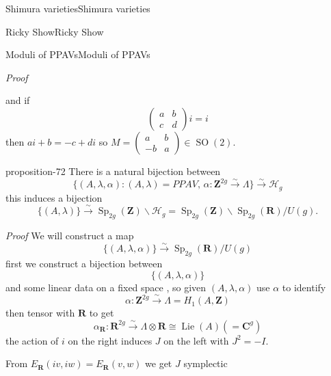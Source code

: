 \documentclass[10pt,]{book}
\makeatletter
\renewcommand*{\proofname}{Proof}
\renewenvironment{proof}[1][\proofname]{\par
  \pushQED{\qed}%
  \normalfont \topsep6\p@\@plus6\p@\relax
  \trivlist
  \item\relax
    {\itshape
    #1\@addpunct{.}}\hspace\labelsep\ignorespaces
}{%
  \popQED\endtrivlist\@endpefalse
}
\numberwithin{equation}{section}
\newcommand{\Lie}{\operatorname{Lie}}
\newcommand{\ZZ}{\mathbf{Z}}
\newcommand{\RR}{\mathbf{R}}
\newcommand{\CC}{\mathbf{C}}
\DeclareMathOperator{\specialorthogonal}{SO}
\DeclareMathOperator{\Sp}{Sp}
\newcommand{\amp}{&}
\makeatother
\begin{document}
\begin{chapterptx}{Shimura varieties}{}{Shimura varieties}{}{}
\begin{sectionptx}{Ricky Show}{}{Ricky Show}{}{}
\begin{subsectionptx}{Moduli of PPAVs}{}{Moduli of PPAVs}{}{}
\begin{proof}
\begin{equation*}
\end{equation*}
and if%
\begin{equation*}
\begin{pmatrix} a \amp b \\ c \amp d\end{pmatrix} i = i
\end{equation*}
then \(ai + b = -c + di\) so \(M= \begin{pmatrix} a\amp b\\ -b \amp a \end{pmatrix}\in \specialorthogonal(2)\).%
\end{proof}
\begin{proposition}{}{}{proposition-72}%
\hypertarget{p-1133}{}%
There is a natural bijection between%
\begin{equation*}
\{(A,\lambda, \alpha) : (A,\lambda)= PPAV,\,\alpha\colon \ZZ^{2g} \xrightarrow \sim \Lambda\} \xrightarrow\sim \mathscr H_g
\end{equation*}
this induces a  bijection%
\begin{equation*}
\{(A,\lambda) \} \xrightarrow \sim \Sp_{2g}(\ZZ) \backslash \mathscr H_g = \Sp_{2g}(\ZZ) \backslash \Sp_{2g} (\RR) / U(g)\text{.}
\end{equation*}
%
\end{proposition}
\begin{proof}\hypertarget{proof-116}{}
\hypertarget{p-1134}{}%
We will construct a map%
\begin{equation*}
\{(A,\lambda ,\alpha)\} \xrightarrow\sim\Sp_{2g} (\RR)/U(g)
\end{equation*}
first we construct  a bijection between%
\begin{equation*}
\{(A,\lambda, \alpha)\}
\end{equation*}
and some linear data on a fixed space , so given \((A, \lambda, \alpha)\) use \(\alpha\) to identify%
\begin{equation*}
\alpha\colon \ZZ^{2g} \xrightarrow \sim \Lambda = H_1(A,\ZZ)
\end{equation*}
then  tensor with \(\RR\) to get%
\begin{equation*}
\alpha_\RR \colon \RR^{2g} \xrightarrow\sim \Lambda\otimes \RR \cong \Lie(A) (= \CC^g)
\end{equation*}
the action of \(i\) on the right induces \(J\) on the left with \(J^2 = -I\).%
\par
\hypertarget{p-1135}{}%
From \(E_\RR(iv,iw) = E_\RR(v,w)\) we get \(J \) symplectic%
\begin{equation*}

\end{equation*}
\end{proof}
\end{subsectionptx}
\end{sectionptx}
\end{chapterptx}
\end{document}

